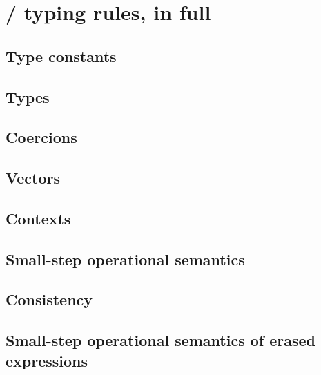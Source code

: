 \chapter{\Pico/ typing rules, in full}
\label{app:pico-rules}

\renewcommand{\ottusedrule}[1]{\[#1\]\\[-1ex]}

\section{Type constants}
\label{app:rules-tc}

\ottdefnTc{}

\section{Types}
\label{app:rules-ty}
\label{app:rules-alt}

\ottdefnTy{}
\ottdefnAlt{}

\section{Coercions}
\label{app:rules-co}
\label{app:rules-prop}

\ottdefnCo{}
\ottdefnProp{}

\section{Vectors}
\label{app:rules-vec}
\label{app:rules-cev}

\ottdefnVec{}
\ottdefnCev{}

\section{Contexts}
\label{app:rules-ctx}
\label{app:rules-sig}

\ottdefnSig{}
\ottdefnCtx{}

\section{Small-step operational semantics}
\label{app:rules-s}

\ottdefnStep{}

\section{Consistency}
\label{app:rules-cons}
\label{app:rules-red}

\ottdefnCons{}
\ottdefnRed{}
\ottdefnRedBnd{}
\ottdefnRedCo{}

\section{Small-step operational semantics of erased expressions}
\label{app:rules-es}

\ottdefnEStep{}
